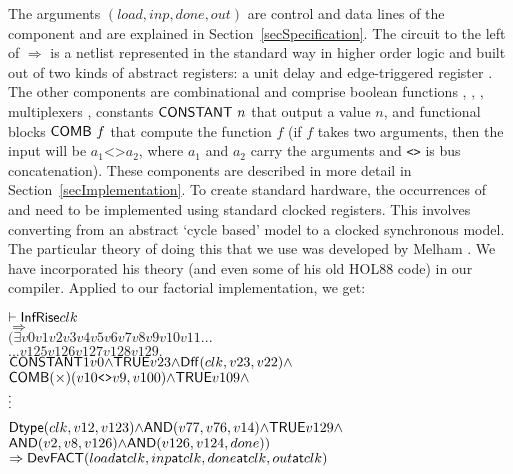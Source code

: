 The arguments $(load,inp,done,out)$ are control and data lines of the
component and are explained in Section~\ref{secSpecification}. The
circuit to the left of $\Rightarrow$ is a netlist represented in the
standard way in higher order logic \cite{Mel93} and built out of two
kinds of abstract registers: a unit delay  and edge-triggered
register . The other components are combinational and
comprise boolean functions ,
, , multiplexers , constants $\mathsf{CONSTANT}~n$ that output a value $n$,
and functional blocks
$\mathsf{COMB}~f$ that compute the function $f$ (if $f$ takes two arguments,
then the input will be $a_1\texttt{<>}a_2$, where $a_1$ and $a_2$ carry the arguments
and \texttt{<>} is bus concatenation). These components are
described in more detail in Section~\ref{secImplementation}. To
create standard hardware, the occurrences of
 and  need to be implemented using standard
clocked registers. This involves converting from an abstract `cycle
based' model to a clocked synchronous model. The particular theory of
doing this that we use was developed by Melham \cite{Mel93}. We have
incorporated his theory (and even some of his old HOL88 code) in
our compiler. Applied to our factorial implementation,
we get:

\vspace*{-1.5mm}

{\baselineskip10pt\begin{alltt}
\( \vdash \DEF{InfRise} clk                                                                        \)
\(   \Rightarrow                                                                                   \)
\(   ({\exists}v0 v1 v2 v3 v4 v5 v6 v7 v8 v9 v10 v11 ...                               \)
\(     ... v125 v126 v127 v128 v129.                                                                   \)
\(     \DEF{CONSTANT} 1 v0 {\wedge} \DEF{TRUE} v23 {\wedge} \DEF{Dff}(clk,v23,v22) {\wedge}        \)
\(     \DEF{COMB}({\times}) (v10\texttt{<>}v9,v100) {\wedge} \DEF{TRUE} v109 {\wedge}                       \)
       \(\raisebox{3mm}{\vdots}\)
\(     \DEF{Dtype}(clk,v12,v123) {\wedge} \DEF{AND}(v77,v76,v14) {\wedge} \DEF{TRUE} v129 {\wedge} \)
\(     \DEF{AND} (v2,v8,v126) {\wedge} \DEF{AND}(v126,v124,done))                                  \)
\(   \Rightarrow \DEF{Dev} \DEF{FACT} (load \DEF{at} clk, inp \DEF{at} clk, done \DEF{at} clk, out \DEF{at} clk) \)
\end{alltt}}

\vspace*{-2.5mm}


